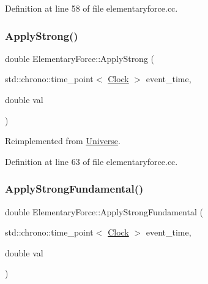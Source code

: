 Definition at line 58 of file elementaryforce.\+cc.

\mbox{\label{class_elementary_force_a8a16bff6b5df2b0ff918262bf6376ade}} 
\subsubsection{\texorpdfstring{Apply\+Strong()}{ApplyStrong()}}
{\footnotesize\ttfamily double Elementary\+Force\+::\+Apply\+Strong (\begin{DoxyParamCaption}\item[{std\+::chrono\+::time\+\_\+point$<$ \mbox{\hyperlink{universe_8h_a0ef8d951d1ca5ab3cfaf7ab4c7a6fd80}{Clock}} $>$}]{event\+\_\+time,  }\item[{double}]{val }\end{DoxyParamCaption})\hspace{0.3cm}{\ttfamily [virtual]}}



Reimplemented from \mbox{\hyperlink{class_universe_a906a88b37f10bfa630bef49dfd0e907a}{Universe}}.



Definition at line 63 of file elementaryforce.\+cc.

\mbox{\label{class_elementary_force_a80f1977e777aa0c8cce2124b666e6446}} 
\subsubsection{\texorpdfstring{Apply\+Strong\+Fundamental()}{ApplyStrongFundamental()}}
{\footnotesize\ttfamily double Elementary\+Force\+::\+Apply\+Strong\+Fundamental (\begin{DoxyParamCaption}\item[{std\+::chrono\+::time\+\_\+point$<$ \mbox{\hyperlink{universe_8h_a0ef8d951d1ca5ab3cfaf7ab4c7a6fd80}{Clock}} $>$}]{event\+\_\+time,  }\item[{double}]{val }\end{DoxyParamCaption})\hspace{0.3cm}{\ttfamily [virtual]}}




